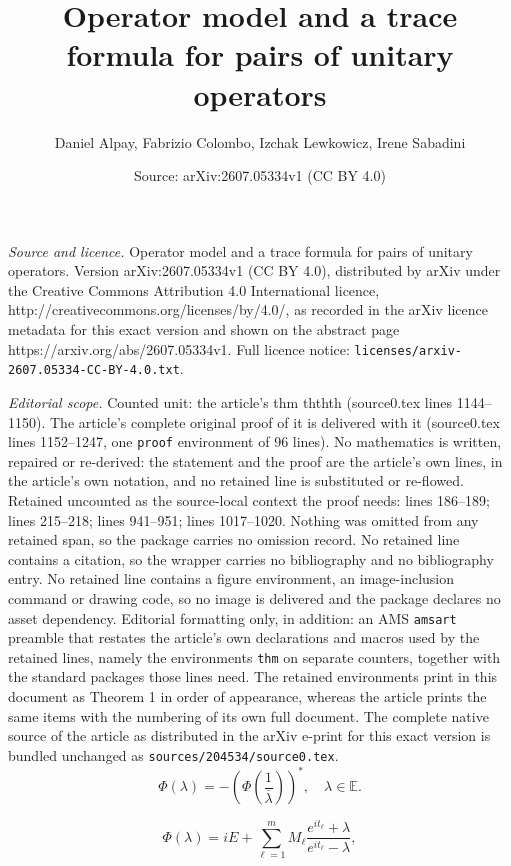 \documentclass[10pt,a4paper]{amsart}
\title{Operator model and a trace formula for pairs of unitary operators}
\author{Daniel Alpay, Fabrizio Colombo, Izchak Lewkowicz, Irene Sabadini}
\date{Source: arXiv:2607.05334v1 (CC BY 4.0)}
\begin{document}
\maketitle

\noindent\emph{Source and licence.} Operator model and a trace formula for pairs of unitary operators. Version arXiv:2607.05334v1 (CC BY 4.0), distributed by arXiv under the Creative Commons Attribution 4.0 International licence, http://creativecommons.org/licenses/by/4.0/, as recorded in the arXiv licence metadata for this exact version and shown on the abstract page https://arxiv.org/abs/2607.05334v1. Full licence notice: \texttt{licenses/arxiv-2607.05334-CC-BY-4.0.txt}.\par\smallskip

\noindent\textit{Editorial scope.} Counted unit: the article's thm ththth (source0.tex lines 1144--1150). The article's complete original proof of it is delivered with it (source0.tex lines 1152--1247, one \texttt{proof} environment of 96 lines). No mathematics is written, repaired or re-derived: the statement and the proof are the article's own lines, in the article's own notation, and no retained line is substituted or re-flowed.  Retained uncounted as the source-local context the proof needs: lines 186--189; lines 215--218; lines 941--951; lines 1017--1020.  Nothing was omitted from any retained span, so the package carries no omission record.  No retained line contains a citation, so the wrapper carries no bibliography and no bibliography entry.  No retained line contains a figure environment, an image-inclusion command or drawing code, so no image is delivered and the package declares no asset dependency.  Editorial formatting only, in addition: an AMS \texttt{amsart} preamble that restates the article's own declarations and macros used by the retained lines, namely the environments \texttt{thm} on separate counters, together with the standard packages those lines need.  The retained environments print in this document as Theorem 1 in order of appearance, whereas the article prints the same items with the numbering of its own full document.  The complete native source of the article as distributed in the arXiv e-print for this exact version is bundled unchanged as \texttt{sources/204534/source0.tex}.
\begin{equation}
  \label{2-2}
\Phi({\lambda})=-\left(\Phi\left(\frac{1}{\overline{{\lambda}}}\right)\right)^*,\quad {\lambda}\in\mathbb E.
  \end{equation}

\begin{equation}
  \label{link}
\Phi(\lambda)=iE+\sum_{\ell=1}^mM_\ell \frac{e^{it_\ell}+\lambda}{e^{it_\ell}-\lambda},
\end{equation}
\end{document}
